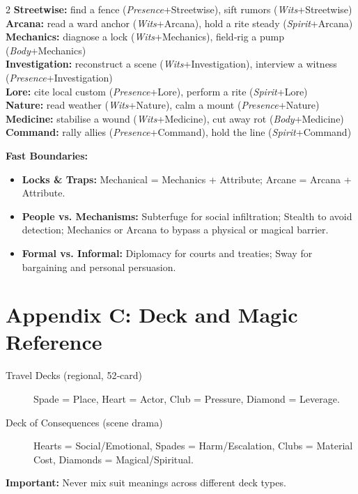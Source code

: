 \begin{tcolorbox}[title=Common Rolls (GM Screen Reference), colback=white!97!gray, colframe=black!80!gray]
\begin{multicols}{2}
\textbf{Streetwise:} find a fence (\emph{Presence}+Streetwise), sift rumors (\emph{Wits}+Streetwise)\\
\textbf{Arcana:} read a ward anchor (\emph{Wits}+Arcana), hold a rite steady (\emph{Spirit}+Arcana)\\
\textbf{Mechanics:} diagnose a lock (\emph{Wits}+Mechanics), field‑rig a pump (\emph{Body}+Mechanics)\\
\textbf{Investigation:} reconstruct a scene (\emph{Wits}+Investigation), interview a witness (\emph{Presence}+Investigation)\\
\textbf{Lore:} cite local custom (\emph{Presence}+Lore), perform a rite (\emph{Spirit}+Lore)\\
\textbf{Nature:} read weather (\emph{Wits}+Nature), calm a mount (\emph{Presence}+Nature)\\
\textbf{Medicine:} stabilise a wound (\emph{Wits}+Medicine), cut away rot (\emph{Body}+Medicine)\\
\textbf{Command:} rally allies (\emph{Presence}+Command), hold the line (\emph{Spirit}+Command)
\end{multicols}
\vspace{0.5em}
\textbf{Fast Boundaries:}
\begin{itemize}
  \item \textbf{Locks \& Traps:} Mechanical = Mechanics + Attribute; Arcane = Arcana + Attribute.
  \item \textbf{People vs. Mechanisms:} Subterfuge for social infiltration; Stealth to avoid detection; Mechanics or Arcana to bypass a physical or magical barrier.
  \item \textbf{Formal vs. Informal:} Diplomacy for courts and treaties; Sway for bargaining and personal persuasion.
\end{itemize}
\end{tcolorbox}

\clearpage
\section*{Appendix C: Deck and Magic Reference}
\label{app:deck-magic}

\begin{tcolorbox}[title=Deck Types and Meanings, colback=white!97!gray, colframe=black!80!gray]
\begin{description}
  \item[Travel Decks (regional, 52‑card)] Spade = Place, Heart = Actor, Club = Pressure, Diamond = Leverage.
  \item[Deck of Consequences (scene drama)] Hearts = Social/Emotional, Spades = Harm/Escalation, Clubs = Material Cost, Diamonds = Magical/Spiritual.
\end{description}
\textbf{Important:} Never mix suit meanings across different deck types.
\end{tcolorbox}


